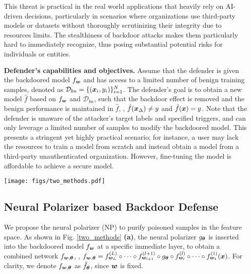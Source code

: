 This threat is practical in the real world applications that heavily rely on AI-driven decisions, particularly in scenarios where organizations use third-party models or datasets without thoroughly scrutinizing their integrity due to resources limits.
The stealthiness of backdoor attacks makes them particularly hard to immediately recognize, thus posing substantial potential risks for individuals or entities.

\noindent \textbf{Defender's capabilities and objectives.}
Assume that the defender is given the backdoored model $f_{\bm{w}}$ and has access to a limited number of benign training samples, denoted as $\mathcal{D}_{bn}=\{(\bm{x}_i,y_i)\}_{i=1}^{N}$. 
The defender's goal is to obtain a new model $\hat{f}$ based on $f_{\bm{w}}$ and $\mathcal{D}_{bn}$, such that the backdoor effect is removed and the benign performance is maintained in $\hat{f}$, \ie, $\hat{f}(\bm{x}_{\Delta}) \neq y$ and $\hat{f}(\bm{x}) = y$. Note that the defender is unaware of the attacker's target labels and specified triggers, and can only leverage a limited number of samples to modify the backdoored model. This presents a stringent yet highly practical scenario; for instance, a user may lack the resources to train a model from scratch and instead obtain a model from a third-party unauthenticated organization. However, fine-tuning the model is affordable to achieve a secure model.

\begin{figure*}
\centering
\vspace{0.5em}
\texttt{[image: figs/two\_methods.pdf]}
\caption{\textbf{(a)}: Neural Polarizer based Backdoor Defense. Backdoor defense by integrating a trainable neural polarizer into the compromised model.
\textbf{(b)}: Class-conditional Neural Polarizer based Backdoor Defense. During training, a trainable neural polarizer is incorporated into the compromised model, with a fusion module that fuses internal features and class information. During inference, the output of the backdoored model is used to guide class-conditional neural polarizer for feature filtering.}
\label{two_methods}
\end{figure*}

\subsection{Neural Polarizer based Backdoor Defense\label{sec3.2}}
We propose the neural polarizer (NP) to purify poisoned samples in the feature space. As shown in Fig. \ref{two_methods} \textbf{(a)}, the neural polarizer $g_{\bm{\theta}}$ is inserted into the backdoored model $f_{\bm{w}}$ at a specific immediate layer, to obtain a combined network $f_{\bm{w}, \bm{\theta}}$, \ie, $f_{\bm{w}, \bm{\theta}}=f^{(L)}_{\bm{w}_{L}} \circ \cdots \circ f^{(l+1)}_{\bm{w}_{l+1}} \circ g_{\bm{\theta}} \circ f^{(l)}_{\bm{w}_{l}} \circ \cdots \circ f^{(1)}_{\bm{w}_{1}} (\bm{x})$. For clarity, we denote $f_{\bm{w}, \bm{\theta}}$ as $\hat{f}_{\bm{\theta}}$, since $\bm{w}$ is fixed.

